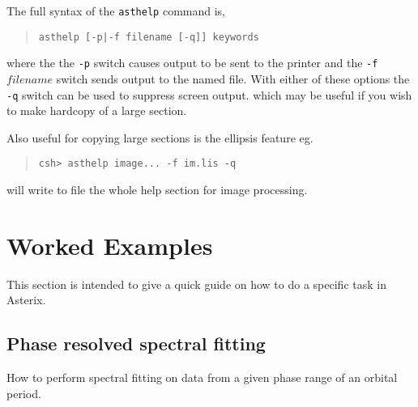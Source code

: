 \documentclass{book}
\renewcommand{\_}{{\tt\char'137}}     %
\begin{document}
The full syntax of the {\tt asthelp} command is,
\begin{quote}\begin{verbatim}
asthelp [-p|-f filename [-q]] keywords
\end{verbatim}\end{quote}
where the the {\tt -p} switch causes output to be sent to the
printer and the {\tt -f} $filename$ switch sends output
to the named file. With either of these options the {\tt -q}
switch can be used to suppress screen output. which may be
useful if you wish to make hardcopy of a large section.

Also useful for copying large sections is the ellipsis
feature eg.

\begin{quote}\begin{verbatim}
csh> asthelp image... -f im.lis -q
\end{verbatim}\end{quote}
will write to file the whole help section for image processing.

\chapter{Worked Examples}
This section is intended to give a quick guide on how to do
a specific task in Asterix.

\section{Phase resolved spectral fitting}
How to perform spectral fitting on data from a given phase range
of an orbital period.
\end{document}
